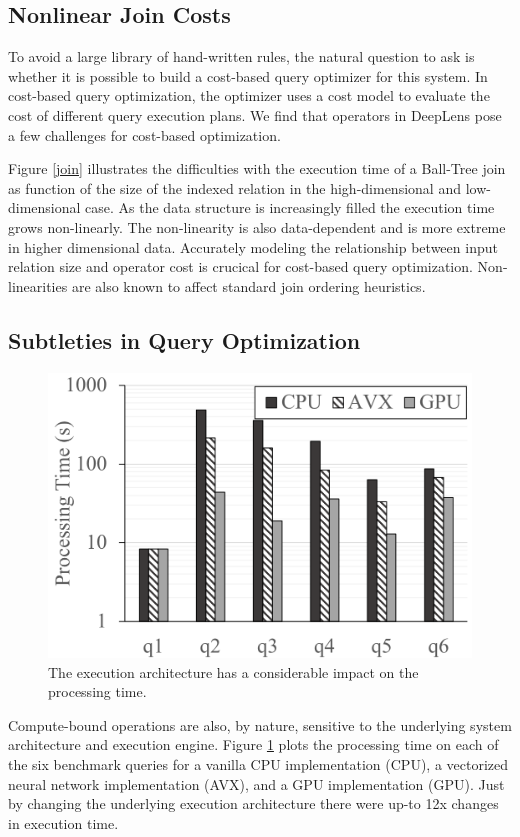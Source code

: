 \subsection{Nonlinear Join Costs}


To avoid a large library of hand-written rules, the natural question to ask is whether it is possible to build a cost-based query optimizer for this system.
In cost-based query optimization, the optimizer uses a cost model to evaluate the cost of different query execution plans. We find that operators in \textsf{DeepLens} pose a few challenges for cost-based optimization. 

Figure \ref{join} illustrates the difficulties with the execution time of a Ball-Tree join as function of the size of the indexed relation in the high-dimensional and low-dimensional case. As the data structure is increasingly filled the execution time grows non-linearly. The non-linearity is also data-dependent and is more extreme in higher dimensional data. Accurately modeling the relationship between input relation size and operator cost is crucical for cost-based query optimization. Non-linearities are also known to affect standard join ordering heuristics.

\subsection{Subtleties in Query Optimization}

\begin{figure}[t]
\centering
 \includegraphics[width=0.8\columnwidth]{figures/build.png}
 \caption{The execution architecture has a considerable impact on the processing time.  \label{build} }
\end{figure}

Compute-bound operations are also, by nature, sensitive to the underlying system architecture and execution engine. Figure \ref{build} plots the processing time on each of the six benchmark queries for a vanilla CPU implementation (CPU), a vectorized neural network implementation (AVX), and a GPU implementation (GPU). Just by changing the underlying execution architecture there were up-to 12x changes in execution time. 


